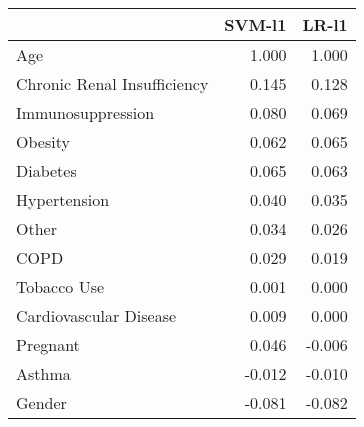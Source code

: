 \begin{tabular}{lrr}
\toprule
{} &  SVM-l1 &  LR-l1 \\
\midrule
Age                         &   1.000 &  1.000 \\
Chronic Renal Insufficiency &   0.145 &  0.128 \\
Immunosuppression           &   0.080 &  0.069 \\
Obesity                     &   0.062 &  0.065 \\
Diabetes                    &   0.065 &  0.063 \\
Hypertension                &   0.040 &  0.035 \\
Other                       &   0.034 &  0.026 \\
COPD                        &   0.029 &  0.019 \\
Tobacco Use                 &   0.001 &  0.000 \\
Cardiovascular Disease      &   0.009 &  0.000 \\
Pregnant                    &   0.046 & -0.006 \\
Asthma                      &  -0.012 & -0.010 \\
Gender                      &  -0.081 & -0.082 \\
\bottomrule
\end{tabular}

